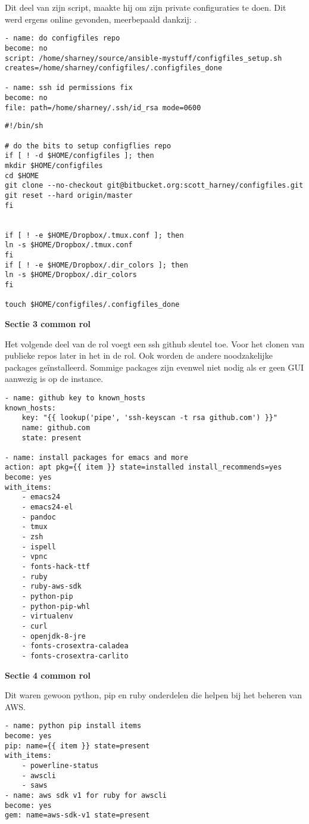 Dit deel van \autocite{commonscottharney} zijn script, maakte hij om zijn private configuraties te doen. Dit werd ergens online gevonden, meerbepaald dankzij: \autocite{justinellin}.
\begin{lstlisting}[basicstyle=\small]
- name: do configfiles repo
become: no
script: /home/sharney/source/ansible-mystuff/configfiles_setup.sh  creates=/home/sharney/configfiles/.configfiles_done

- name: ssh id permissions fix 
become: no
file: path=/home/sharney/.ssh/id_rsa mode=0600
\end{lstlisting}

\begin{lstlisting}[basicstyle=\small]
#!/bin/sh

# do the bits to setup configflies repo
if [ ! -d $HOME/configfiles ]; then
mkdir $HOME/configfiles 
cd $HOME
git clone --no-checkout git@bitbucket.org:scott_harney/configfiles.git
git reset --hard origin/master
fi


if [ ! -e $HOME/Dropbox/.tmux.conf ]; then 
ln -s $HOME/Dropbox/.tmux.conf
fi
if [ ! -e $HOME/Dropbox/.dir_colors ]; then
ln -s $HOME/Dropbox/.dir_colors
fi

touch $HOME/configfiles/.configfiles_done
\end{lstlisting}

\newpage
\textbf{Sectie 3 common rol}

Het volgende deel van de rol voegt een ssh github sleutel toe. Voor het clonen van publieke repos later in het in de rol. Ook worden de andere noodzakelijke packages geïnstalleerd. Sommige packages zijn evenwel niet nodig als er geen GUI aanwezig is op de instance.
\begin{lstlisting}[basicstyle=\small]
- name: github key to known_hosts
known_hosts:
    key: "{{ lookup('pipe', 'ssh-keyscan -t rsa github.com') }}"
    name: github.com
    state: present

- name: install packages for emacs and more
action: apt pkg={{ item }} state=installed install_recommends=yes
become: yes
with_items:
    - emacs24
    - emacs24-el
    - pandoc
    - tmux
    - zsh
    - ispell
    - vpnc
    - fonts-hack-ttf
    - ruby
    - ruby-aws-sdk
    - python-pip
    - python-pip-whl
    - virtualenv
    - curl
    - openjdk-8-jre
    - fonts-crosextra-caladea
    - fonts-crosextra-carlito 
\end{lstlisting}

\textbf{Sectie 4 common rol}

Dit waren gewoon python, pip en ruby onderdelen die helpen bij het beheren van AWS.
\begin{lstlisting}[basicstyle=\small]
- name: python pip install items
become: yes
pip: name={{ item }} state=present
with_items:
    - powerline-status
    - awscli
    - saws
- name: aws sdk v1 for ruby for awscli
become: yes
gem: name=aws-sdk-v1 state=present
\end{lstlisting}

